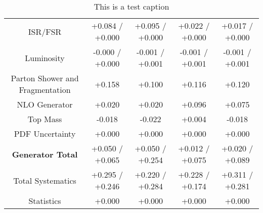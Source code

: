 \begin{table}[htbp]
\begin{center}
\begin{tabular}{|c|c|c|c|c|}
ISR/FSR                               &+0.084   / +0.000   & +0.095   / +0.000   & +0.022   / +0.000   & +0.017   / +0.000  \\
Luminosity                            &-0.000   / +0.000   & -0.001   / +0.001   & -0.001   / +0.001   & -0.001   / +0.001  \\
Parton Shower and Fragmentation       &+0.158              & +0.100              & +0.116              & +0.120             \\
NLO Generator                         &+0.020              & +0.020              & +0.096              & +0.075             \\
Top Mass                              &-0.018              & -0.022              & +0.004              & -0.018             \\
PDF Uncertainty                       &+0.000              & +0.000              & +0.000              & +0.000             \\
\hline
\textbf{Generator Total}              &+0.050   / +0.065   & +0.050   / +0.254   & +0.012   / +0.075   & +0.020   / +0.089  \\
\hline
\hline
Total Systematics                     &+0.295   / +0.246   & +0.220   / +0.284   & +0.228   / +0.174   & +0.311   / +0.281  \\
Statistics                            &+0.000              & +0.000              & +0.000              & +0.000             \\
\hline
  \end{tabular}
  \end{center} 
  \label{tab:fsm_nominal_rratio_low}
  \caption{This is a test caption}
\end{table}

